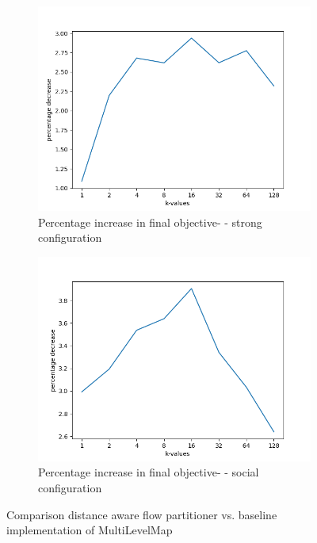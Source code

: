 \documentclass[acmsmall,nonacm,screen,review]{acmart}
\begin{document}
\begin{figure}
  \captionsetup[subfigure]{justification=centering}
\centering
\begin{subfigure}[t]{0.485\textwidth}
  \centering
  \includegraphics[width=\textwidth]{images/perctentage_increase_finalobjective_strong_vanialla_vs_improved.png}
  \caption{Percentage increase in final objective-  - strong configuration}
  \label{fig:comparison_vanilla_strong}
\end{subfigure}
\begin{subfigure}[t]{0.485\textwidth}
  \centering
  \includegraphics[width=\textwidth]{images/perctentage_increase_finalobjective_social_vanialla_vs_improved.png}
  \caption{Percentage increase in final objective-  - social configuration}
  \label{fig:comp_vanilla_social}
\end{subfigure}

\caption{Comparison distance aware flow partitioner vs. baseline implementation of MultiLevelMap}
\label{fig:LSeco}
\end{figure} 
\end{document}
